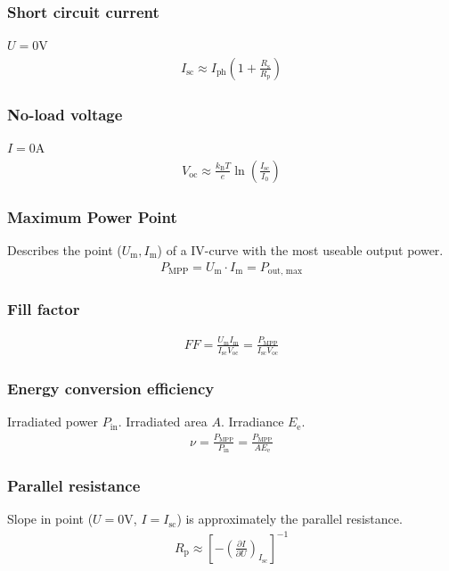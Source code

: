 \documentclass[a4paper, 12pt]{scrartcl}
\begin{document}
\subsubsection{Short circuit current}
$U=0$V
\begin{align}
I_\textrm{sc} \approx I_\textrm{ph} \left( 1 + \frac{R_\textrm{s}}{R_\textrm{p}} \right)
\end{align}
\subsubsection{No-load voltage} 
$I=0$A 
\begin{align}
V_\textrm{oc} \approx \frac{k_\textrm{B}T}{e} \ln(\frac{I_\textrm{sc}}{I_0}) 
\end{align}
\subsubsection{Maximum Power Point}
Describes the point ($U_\textrm{m}, I_\textrm{m}$) of a IV-curve with the most useable output power. 
\begin{align}
P_\textrm{MPP} = U_\textrm{m} \cdot I_\textrm{m} = P_\textrm{out, max}
\end{align}
\subsubsection{Fill factor} 
\begin{align}
FF=\frac{U_\textrm{m} I_\textrm{m}}{I_\textrm{sc} V_\textrm{oc}}=\frac{P_\textrm{MPP} }{ I_\textrm{sc} V_\textrm{oc}}
\end{align}
\subsubsection{Energy conversion efficiency} 
Irradiated power $P_\textrm{in}$. Irradiated area $A$. Irradiance $E_\textrm{e}$.
\begin{align}
\nu = \frac{P_\textrm{MPP}}{P_\textrm{in}} = \frac{P_\textrm{MPP}}{A E_\textrm{e}} 
\end{align}
\subsubsection{Parallel resistance} 
Slope in point ($U=0$V, $I=I_\textrm{sc}$) is approximately the parallel resistance. 
\begin{align}
R_\textrm{p} \approx \left[ - \left( \frac{\partial I}{\partial U} \right)_{I_\textrm{sc}} \right]^{-1}
\end{align}
\end{document}
